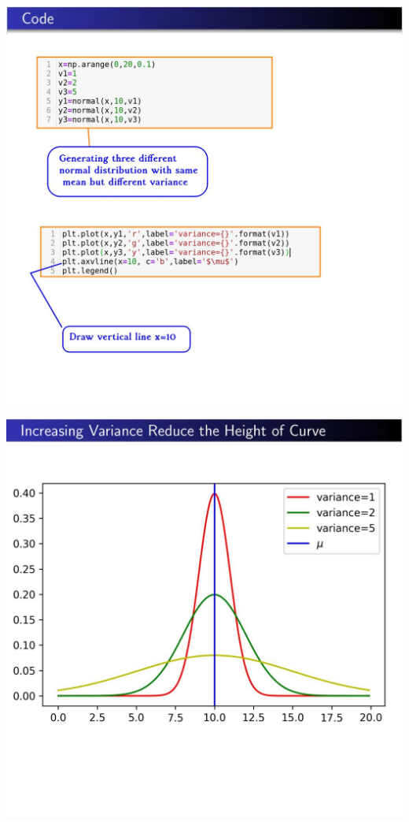 \documentclass[12pt,aspectratio=169]{beamer}
\begin{document}
\begin{frame}
\begin{center}
\includegraphics[scale=0.3]{4}
\end{center}
\end{frame}


\begin{frame}
\begin{center}
\includegraphics[scale=0.3]{5}
\end{center}
\end{frame}
\end{document}
